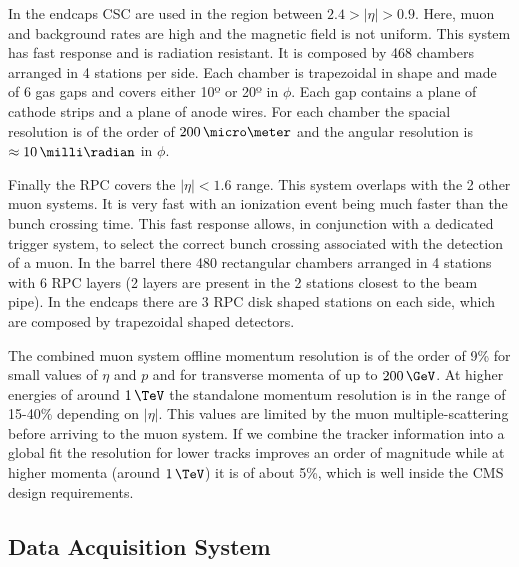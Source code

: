 In the endcaps \gls{CSC} are used in the region between $2.4>|\eta|>0.9$. Here, muon and background rates are high and the magnetic field is not uniform. This system has fast response and is radiation resistant. It is composed by 468 chambers arranged in 4 stations per side. Each chamber is trapezoidal in shape and made of 6 gas gaps and covers either 10º or 20º in $\phi$. Each gap contains a plane of cathode strips and a plane of anode wires. For each chamber the spacial resolution is of the order of $200\,\micro\meter$ and the angular resolution is $\approx 10\,\milli\radian$ in $\phi$.

Finally the \gls{RPC} covers the $|\eta|<1.6$ range. This system overlaps with the 2 other muon systems. It is very fast with an ionization event being much faster than the bunch crossing time. This fast response allows, in conjunction with a dedicated trigger system, to select the correct bunch crossing associated with the detection of a muon. In the barrel there 480 rectangular chambers arranged in 4 stations with 6 \gls{RPC} layers (2 layers are present in the 2 stations closest to the beam pipe). In the endcaps there are 3 \gls{RPC} disk shaped stations on each side, which are composed by trapezoidal shaped detectors.

The combined muon system offline momentum resolution is of the order of 9\% for small values of $\eta$ and $p$ and for transverse momenta of up to $200\,\GeV$. At higher energies of around $1\,\TeV$ the standalone momentum resolution is in the range of 15-40\% depending on $|\eta|$. This values are limited by the muon multiple-scattering before arriving to the muon system. If we combine the tracker information into a global fit the resolution for lower \pt tracks improves an order of magnitude while at higher momenta (around $1\,\TeV$) it is of about 5\%, which is well inside the \gls{CMS} design requirements.

\subsection{Data Acquisition System}
\label{SUBSECTION:ExperimentalApparatus_CMS_DAQ}


